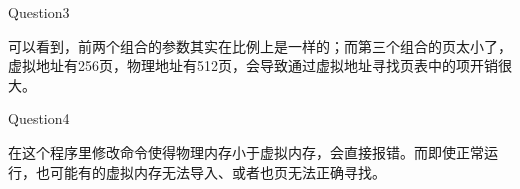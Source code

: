 \documentclass[12pt]{article}
\begin{document}
\begin{large}
	\noindent Question3\\
\end{large}
\hspace*{2em}可以看到，前两个组合的参数其实在比例上是一样的；而第三个组合的页太小了，虚拟地址有256页，物理地址有512页，会导致通过虚拟地址寻找页表中的项开销很大。\\

\begin{large}
	\noindent Question4\\
\end{large}
\hspace*{2em}在这个程序里修改命令使得物理内存小于虚拟内存，会直接报错。而即使正常运行，也可能有的虚拟内存无法导入、或者也页无法正确寻找。
\end{document}
